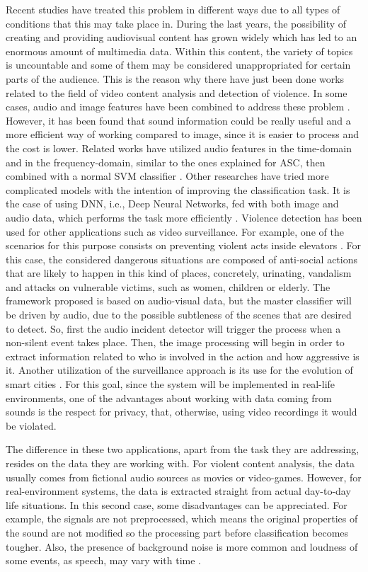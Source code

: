 	Recent studies have treated this problem in different ways due to all types of conditions that this may take place in. During the last years, the possibility of creating and providing audiovisual content has grown widely which has led to an enormous amount of multimedia data. Within this content, the variety of topics is uncountable and some of them may be considered unappropriated for certain parts of the audience. This is the reason why there have just been done works related to the field of video content analysis and detection of violence. In some cases, audio and image features have been combined to address these problem \cite{Giannakopoulos2010}. However, it has been found that sound information could be really useful and a more efficient way of working compared to image, since it is easier to process and the cost is lower. Related works have utilized audio features in the time-domain and in the frequency-domain, similar to the ones explained for ASC, then combined with a normal SVM classifier \cite{Giannakopoulos2006}. Other researches have tried more complicated models with the intention of improving the classification task. It is the case of using DNN, i.e., Deep Neural Networks, fed with both image and audio data, which performs the task more efficiently \cite{Ali2018}. Violence detection has been used for other applications such as video surveillance. For example, one of the scenarios for this purpose consists on preventing violent acts inside elevators \cite{Chua2014}. For this case, the considered dangerous situations are composed of anti-social actions that are likely to happen in this kind of places, concretely, urinating, vandalism and attacks on vulnerable victims, such as women, children or elderly. The framework proposed is based on audio-visual data, but the master classifier will be driven by audio, due to the possible subtleness of the scenes that are desired to detect. So, first the audio incident detector will trigger the process when a non-silent event takes place. Then, the image processing will begin in order to extract information related to who is involved in the action and how aggressive is it. Another utilization of the surveillance approach is its use for the evolution of smart cities \cite{Garcia-Gomez2016}. For this goal, since the system will be implemented in real-life environments, one of the advantages about working with data coming from sounds is the respect for privacy, that, otherwise, using video recordings it would be violated.
	
	The difference in these two applications, apart from the task they are addressing, resides on the data they are working with. For violent content analysis, the data usually comes from fictional audio sources as movies or video-games. However, for real-environment systems, the data is extracted straight from actual day-to-day life situations. In this second case, some disadvantages can be appreciated. For example, the signals are not preprocessed, which means the original properties of the sound are not modified so the processing part before classification becomes tougher. Also, the presence of background noise is more common and loudness of some events, as speech, may vary with time \cite{Bautista-Duran2017}. 

